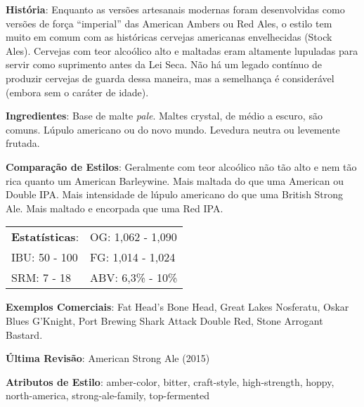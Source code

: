 \textbf{História}: Enquanto as versões artesanais modernas foram desenvolvidas como versões de força “imperial” das American Ambers ou Red Ales, o estilo tem muito em comum com as históricas cervejas americanas envelhecidas (Stock Ales). Cervejas com teor alcoólico alto e maltadas eram altamente lupuladas para servir como suprimento antes da Lei Seca. Não há um legado contínuo de produzir cervejas de guarda dessa maneira, mas a semelhança é considerável (embora sem o caráter de idade).

\textbf{Ingredientes}: Base de malte \textit{pale}. Maltes crystal, de médio a escuro, são comuns. Lúpulo americano ou do novo mundo. Levedura neutra ou levemente frutada.

\textbf{Comparação de Estilos}: Geralmente com teor alcoólico não tão alto e nem tão rica quanto um American Barleywine. Mais maltada do que uma American ou Double IPA. Mais intensidade de lúpulo americano do que uma British Strong Ale. Mais maltado e encorpada que uma Red IPA.

\begin{tabular}{@{}p{35mm}p{35mm}@{}}
  \textbf{Estatísticas}: & OG: 1,062 - 1,090  \\
  IBU: 50 - 100  & FG: 1,014 - 1,024   \\
  SRM: 7 - 18 & ABV: 6,3\% - 10\%
\end{tabular}

\textbf{Exemplos Comerciais}: Fat Head's Bone Head, Great Lakes Nosferatu, Oskar Blues G'Knight, Port Brewing Shark Attack Double Red, Stone Arrogant Bastard.

\textbf{Última Revisão}: American Strong Ale (2015)

\textbf{Atributos de Estilo}: amber-color, bitter, craft-style, high-strength, hoppy, north-america, strong-ale-family, top-fermented

